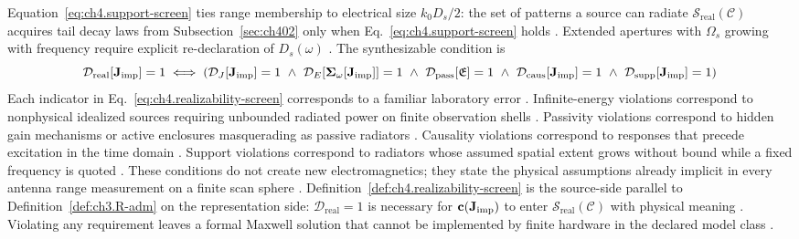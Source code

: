 Equation~\eqref{eq:ch4.support-screen} ties range membership to electrical size \(k_{0}D_{s}/2\): the
set of patterns a source can radiate \(\mathcal{S}_{\mathrm{real}}(\mathcal{C})\) acquires tail decay laws from
Subsection~\ref{sec:ch402} only when Eq.~\eqref{eq:ch4.support-screen} holds
\cite{stratton1941}. Extended apertures with \(\Omega_{s}\) growing with
frequency require explicit re-declaration of \(D_{s}(\omega)\) \cite{harrington2001}.
\label{def:ch4.realizability-screen}
The synthesizable condition is
\begin{equation}
\label{eq:ch4.range membership-screen}
\mathcal{D}_{\mathrm{real}}[\mathbf{J}_{\mathrm{imp}}]
=
1
\iff
\left(
\mathcal{D}_{J}[\mathbf{J}_{\mathrm{imp}}]=1\
\wedge\
\mathcal{D}_{E}[\boldsymbol{\Sigma}_\omega[\mathbf{J}_{\mathrm{imp}}]]=1\
\wedge\
\mathcal{D}_{\mathrm{pass}}[\mathfrak{E}]=1\
\wedge\
\mathcal{D}_{\mathrm{caus}}[\mathbf{J}_{\mathrm{imp}}]=1\
\wedge\
\mathcal{D}_{\mathrm{supp}}[\mathbf{J}_{\mathrm{imp}}]=1
\right)
\end{equation}
Each indicator in Eq.~\eqref{eq:ch4.realizability-screen} corresponds to a familiar laboratory error
\cite{harrington2001}.
Infinite-energy violations correspond to nonphysical idealized sources requiring unbounded radiated power on
finite observation shells \cite{stratton1941}.
Passivity violations correspond to hidden gain mechanisms or active enclosures masquerading as passive radiators
\cite{harrington2001}.
Causality violations correspond to responses that precede excitation in the time domain \cite{stratton1941}.
Support violations correspond to radiators whose assumed spatial extent grows without bound while a fixed
frequency is quoted \cite{hansen1988}.
These conditions do not create new electromagnetics; they state the physical assumptions already implicit in
every antenna range measurement on a finite scan sphere \cite{harrington2001}.
Definition~\ref{def:ch4.realizability-screen} is the source-side parallel to
Definition~\ref{def:ch3.R-adm} on the representation side: \(\mathcal{D}_{\mathrm{real}}=1\) is necessary
for \(\mathbf{c}(\mathbf{J}_{\mathrm{imp}})\) to enter \(\mathcal{S}_{\mathrm{real}}(\mathcal{C})\) with physical meaning
\cite{stratton1941}. Violating any requirement leaves a formal Maxwell solution that cannot be
implemented by finite hardware in the declared model class \cite{harrington2001}.
